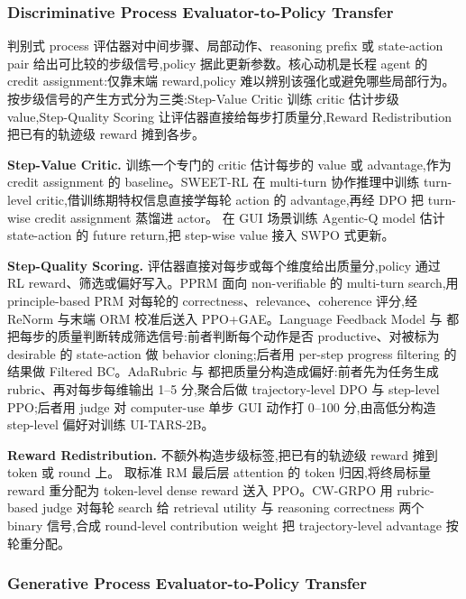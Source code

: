 \subsubsection{Discriminative Process Evaluator-to-Policy Transfer}

判别式 process 评估器对中间步骤、局部动作、reasoning prefix 或 state-action pair 给出可比较的步级信号,policy 据此更新参数。核心动机是长程 agent 的 credit assignment:仅靠末端 reward,policy 难以辨别该强化或避免哪些局部行为。按步级信号的产生方式分为三类:Step-Value Critic 训练 critic 估计步级 value,Step-Quality Scoring 让评估器直接给每步打质量分,Reward Redistribution 把已有的轨迹级 reward 摊到各步。

\textbf{Step-Value Critic.} 训练一个专门的 critic 估计每步的 value 或 advantage,作为 credit assignment 的 baseline。SWEET-RL \cite{Zho25p} 在 multi-turn 协作推理中训练 turn-level critic,借训练期特权信息直接学每轮 action 的 advantage,再经 DPO 把 turn-wise credit assignment 蒸馏进 actor。\cite{Wan26s} 在 GUI 场景训练 Agentic-Q model 估计 state-action 的 future return,把 step-wise value 接入 SWPO 式更新。

\textbf{Step-Quality Scoring.} 评估器直接对每步或每个维度给出质量分,policy 通过 RL reward、筛选或偏好写入。PPRM \cite{Xu25h} 面向 non-verifiable 的 multi-turn search,用 principle-based PRM 对每轮的 correctness、relevance、coherence 评分,经 ReNorm 与末端 ORM 校准后送入 PPO+GAE。Language Feedback Model \cite{Zho24e} 与 \cite{Pan24b} 都把每步的质量判断转成筛选信号:前者判断每个动作是否 productive、对被标为 desirable 的 state-action 做 behavior cloning;后者用 per-step progress filtering 的结果做 Filtered BC。AdaRubric \cite{Din26e} 与 \cite{Luo25f} 都把质量分构造成偏好:前者先为任务生成 rubric、再对每步每维输出 1–5 分,聚合后做 trajectory-level DPO 与 step-level PPO;后者用 judge 对 computer-use 单步 GUI 动作打 0–100 分,由高低分构造 step-level 偏好对训练 UI-TARS-2B。

\textbf{Reward Redistribution.} 不额外构造步级标签,把已有的轨迹级 reward 摊到 token 或 round 上。\cite{Cha24b} 取标准 RM 最后层 attention 的 token 归因,将终局标量 reward 重分配为 token-level dense reward 送入 PPO。CW-GRPO \cite{Wan26ac} 用 rubric-based judge 对每轮 search 给 retrieval utility 与 reasoning correctness 两个 binary 信号,合成 round-level contribution weight 把 trajectory-level advantage 按轮重分配。

\subsubsection{Generative Process Evaluator-to-Policy Transfer}

